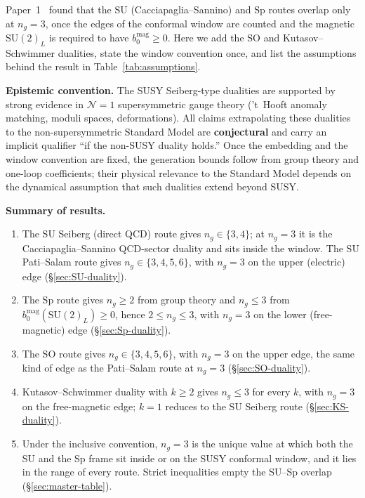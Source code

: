\documentclass[11pt,a4paper]{article}
\theoremstyle{plain}
\theoremstyle{definition}
\theoremstyle{remark}
\newcommand{\ngen}{n_g}
\newcommand{\SU}[1]{\mathrm{SU}(#1)}
\begin{document}
Paper~1~\cite{Paper1} found that the $\mathrm{SU}$ (Cacciapaglia--Sannino) and
$\mathrm{Sp}$ routes overlap only at $\ngen = 3$, once the edges of the
conformal window are counted and the magnetic $\SU{2}_L$ is required to
have $b_0^{\mathrm{mag}} \geq 0$.  Here we add the $\mathrm{SO}$ and
Kutasov--Schwimmer dualities, state the window convention once, and list
the assumptions behind the result in Table~\ref{tab:assumptions}.

\medskip

\textbf{Epistemic convention.}  The SUSY Seiberg-type dualities are
supported by strong evidence in $\mathcal{N}=1$ supersymmetric gauge
theory ('t~Hooft anomaly matching, moduli spaces, deformations).  All
claims extrapolating these dualities to the non-supersymmetric Standard
Model are \textbf{conjectural} and carry an implicit qualifier ``if the
non-SUSY duality holds.''  Once the embedding and the window convention
are fixed, the generation bounds follow from group theory and one-loop
coefficients; their physical relevance to the Standard Model depends on
the dynamical assumption that such dualities extend beyond SUSY.

\medskip

\textbf{Summary of results.}
\begin{enumerate}
  \item The $\mathrm{SU}$ Seiberg (direct QCD) route gives
    $\ngen \in \{3, 4\}$; at $\ngen = 3$ it is the Cacciapaglia--Sannino
    QCD-sector duality and sits inside the window.  The $\mathrm{SU}$
    Pati--Salam route gives $\ngen \in \{3, 4, 5, 6\}$, with $\ngen = 3$
    on the upper (electric) edge (\S\ref{sec:SU-duality}).
  \item The $\mathrm{Sp}$ route gives $\ngen \geq 2$ from group theory and
    $\ngen \leq 3$ from $b_0^{\mathrm{mag}}(\SU{2}_L) \geq 0$, hence
    $2 \leq \ngen \leq 3$, with $\ngen = 3$ on the lower (free-magnetic)
    edge (\S\ref{sec:Sp-duality}).
  \item The $\mathrm{SO}$ route gives $\ngen \in \{3, 4, 5, 6\}$, with
    $\ngen = 3$ on the upper edge, the same kind of edge as the
    Pati--Salam route at $\ngen = 3$ (\S\ref{sec:SO-duality}).
  \item Kutasov--Schwimmer duality with $k \geq 2$ gives $\ngen \leq 3$
    for every $k$, with $\ngen = 3$ on the free-magnetic edge; $k = 1$
    reduces to the $\mathrm{SU}$ Seiberg route (\S\ref{sec:KS-duality}).
  \item Under the inclusive convention, $\ngen = 3$ is the unique value
    at which both the SU and the Sp frame sit inside or on the SUSY
    conformal window, and it lies in the range of every route.  Strict
    inequalities empty the SU--Sp overlap (\S\ref{sec:master-table}).
\end{enumerate}
\end{document}
